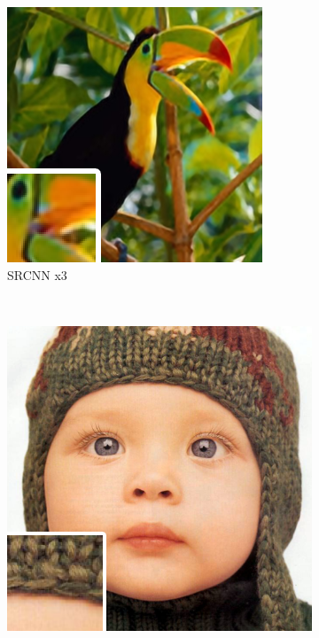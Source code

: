 \documentclass[
			fontsize = 12pt,
			paper = a4
			]
			{scrartcl}%
\newcommand{\?}{\ensuremath{^\texttt{\textbf [CITATION~NEEDED]}}}
\begin{document}
\begin{figure}[!ht]
\begin{subfigure}[b]{0.3\textwidth}
     \end{subfigure}
     \hfill
     \begin{subfigure}[b]{0.3\textwidth}
         \centering
         \caption{SRCNN x3}
         \includegraphics[width=\textwidth]{fig/examples/bird_srcnn_x3}
     \end{subfigure}\\
     \vspace{5mm}
     \begin{subfigure}[b]{0.3\textwidth}
         \centering
         \includegraphics[width=\textwidth]{fig/examples/baby_GT}

\end{subfigure}
\end{figure}
\end{document}
